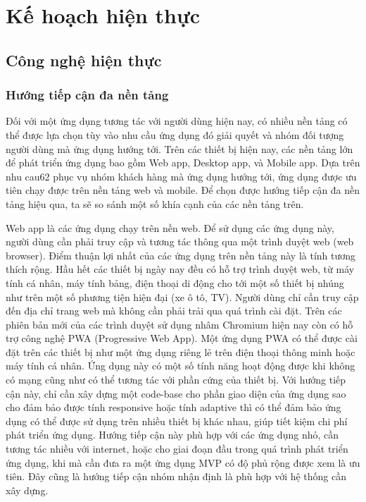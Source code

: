 \documentclass[../main.tex]{subfiles}
\begin{document}
	\justifying


	\chapter{Kế hoạch hiện thực}
	\label{chap:implementation}


	\section{Công nghệ hiện thực}

	\subsection{Hướng tiếp cận đa nền tảng}

	Đối với một ứng dụng tương tác với người dùng hiện nay, có nhiều nền tảng có thể được lựa chọn tùy vào nhu cầu ứng
	dụng đó giải quyết và nhóm đối tượng người dùng mà ứng dụng hướng tới. Trên các thiết bị hiện nay, các nền tảng lớn để
	phát triển ứng dụng bao gồm Web app, Desktop app, và Mobile app. Dựa trên nhu cau62 phục vụ nhóm khách hàng mà ứng
	dụng hướng tới, ứng dụng được ưu tiên chạy được trên nền tảng web và mobile. Để chọn được hướng tiếp cận đa nền tảng
	hiệu qua, ta sẽ so sánh một số khía cạnh của các nền tảng trên.

	Web app là các ứng dụng chạy trên nền web. Để sử dụng các ứng dụng này, người dùng cần phải truy cập và tương tác
	thông qua một trình duyệt web (web browser). Điểm thuận lợi nhất của các ứng dụng trên nền tảng này là tính tương
	thích rộng. Hầu hết các thiết bị ngày nay đều có hỗ trợ trình duyệt web, từ máy tính cá nhân, máy tính bảng, điện
	thoại di động cho tới một số thiết bị nhúng như trên một số phương tiện hiện đại (xe ô tô, TV). Người dùng chỉ cần
	truy cập đến địa chỉ trang web mà không cần phải trải qua quá trình cài đặt. Trên các phiên bản mới của các trình
	duyệt sử dụng nhâm Chromium hiện nay còn có hỗ trợ công nghệ PWA (Progressive Web App). Một ứng dụng PWA có thể được
	cài đặt trên các thiết bị như một ứng dụng riêng lẻ trên điện thoại thông minh hoặc máy tính cá nhân. Ứng dụng này có
	một số tính năng hoạt động được khi không có mạng cũng như có thể tương tác với phần cứng của thiết bị. Với hướng tiếp
	cận này, chỉ cần xây dựng một code-base cho phần giao diện của ứng dụng sao cho đảm bảo được tính responsive hoặc tính
	adaptive thì có thể đảm bảo ứng dụng có thể được sử dụng trên nhiều thiết bị khác nhau, giúp tiết kiệm chi phí phát
	triển ứng dụng. Hướng tiếp cận này phù hợp với các ứng dụng nhỏ, cần tương tác nhiều với internet, hoặc cho giai đoạn
	đầu trong quá trình phát triển ứng dụng, khi mà cần đưa ra một ứng dụng MVP có độ phủ rộng được xem là ưu tiên. Đây
	cũng là hướng tiếp cận nhóm nhận định là phù hợp với hệ thống cần xây dựng.
\end{document}
